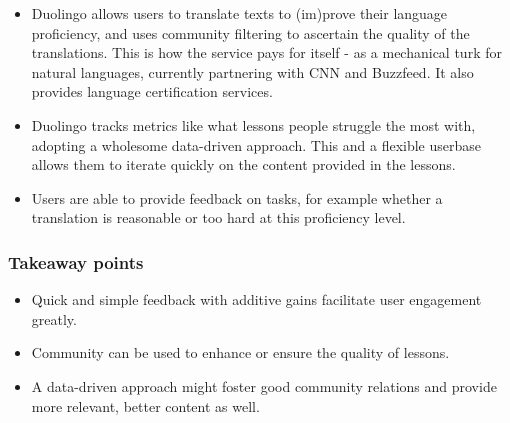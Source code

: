 \begin{itemize}
\item Duolingo allows users to translate texts to (im)prove their language
  proficiency, and uses community filtering to ascertain the quality of the
  translations. This is how the service pays for itself - as a mechanical turk
  for natural languages, currently partnering with CNN and
  Buzzfeed.\cite{duolingobuzz} It also provides language certification
  services.\cite{duolingocert}
\item Duolingo tracks metrics like what lessons people struggle the most with,
  adopting a wholesome data-driven approach. This and a flexible userbase allows
  them to iterate quickly on the content provided in the
  lessons.\cite{duolingodatadriven}
\item Users are able to provide feedback on tasks, for example whether a translation
  is reasonable or too hard at this proficiency level.
\end{itemize}

\subsubsection{Takeaway points}

\begin{itemize}
\item Quick and simple feedback with additive gains facilitate user engagement
  greatly.
\item Community can be used to enhance or ensure the quality of lessons.
\item A data-driven approach might foster good community relations and provide more
  relevant, better content as well.
\end{itemize}
